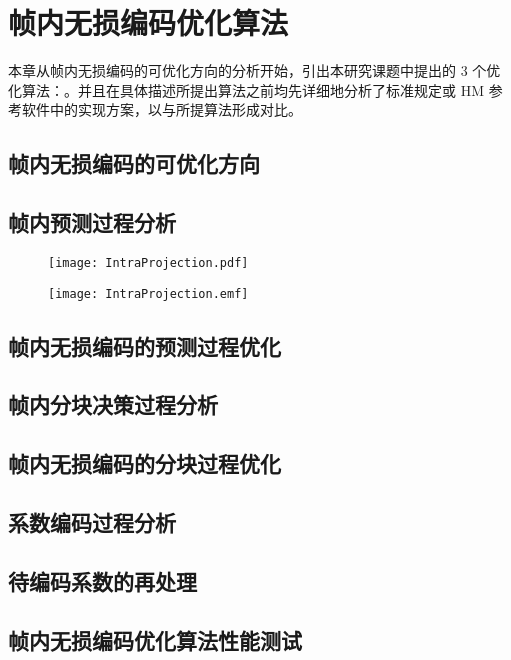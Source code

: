 \chapter{帧内无损编码优化算法}
\label{cha:c3}
本章从帧内无损编码的可优化方向的分析开始，引出本研究课题中提出的 3 个优化算法：。并且在具体描述所提出算法之前均先详细地分析了标准规定或 HM 参考软件中的实现方案，以与所提算法形成对比。

\section{帧内无损编码的可优化方向}

\section{帧内预测过程分析}
\label{cha:IntraPredDetail}
\begin{figure}
    \centering
    \texttt{[image: IntraProjection.pdf]}
\end{figure}
\begin{figure}
    \centering
    \texttt{[image: IntraProjection.emf]}
\end{figure}

\section{帧内无损编码的预测过程优化}

\section{帧内分块决策过程分析}

\section{帧内无损编码的分块过程优化}

\section{系数编码过程分析}

\section{待编码系数的再处理}

\section{帧内无损编码优化算法性能测试}